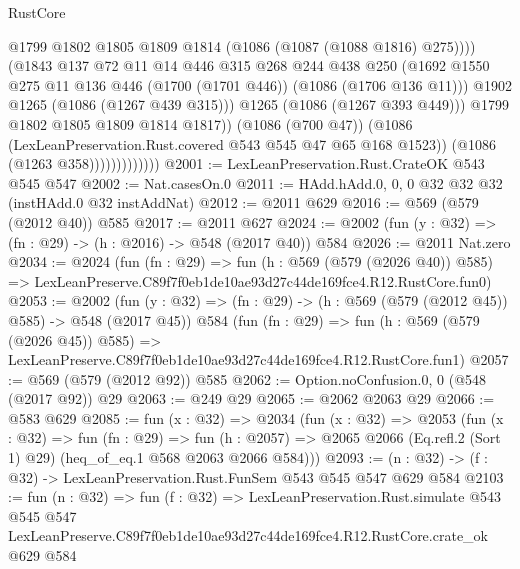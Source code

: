 \begin{lexlean}{RustCore}
\begin{coremodule}
                                    @1799
                                    @1802
                                    @1805
                                    @1809
                                    @1814
                                    (@1086 (@1087 (@1088 @1816) @275))))
                                (@1843
                                  @137
                                  @72
                                  @11
                                  @14
                                  @446
                                  @315
                                  @268
                                  @244
                                  @438
                                  @250
                                  (@1692
                                    @1550
                                    @275
                                    @11
                                    @136
                                    @446
                                    (@1700 (@1701 @446))
                                    (@1086 (@1706 @136 @11)))
                                  @1902
                                  @1265
                                  (@1086 (@1267 @439 @315)))
                                @1265
                                (@1086 (@1267 @393 @449)))
                              @1799
                              @1802
                              @1805
                              @1809
                              @1814
                              @1817))
                          (@1086 (@700 @47))
                          (@1086 (LexLeanPreservation.Rust.covered @543 @545 @47 @65 @168 @1523))
                          (@1086 (@1263 @358)))))))))))))
@2001 := LexLeanPreservation.Rust.CrateOK @543 @545 @547
@2002 := Nat.casesOn.{0}
@2011 := HAdd.hAdd.{0, 0, 0} @32 @32 @32 (instHAdd.{0} @32 instAddNat)
@2012 := @2011 @629
@2016 := @569 (@579 (@2012 @40)) @585
@2017 := @2011 @627
@2024 := @2002 (fun (y : @32) => (fn : @29) -> (h : @2016) -> @548 (@2017 @40)) @584
@2026 := @2011 Nat.zero
@2034 := @2024
    (fun (fn : @29) =>
    fun (h : @569 (@579 (@2026 @40)) @585) =>
    LexLeanPreserve.C89f7f0eb1de10ae93d27c44de169fce4.R12.RustCore.fun0)
@2053 := @2002
    (fun (y : @32) => (fn : @29) -> (h : @569 (@579 (@2012 @45)) @585) -> @548 (@2017 @45))
    @584
    (fun (fn : @29) =>
    fun (h : @569 (@579 (@2026 @45)) @585) =>
    LexLeanPreserve.C89f7f0eb1de10ae93d27c44de169fce4.R12.RustCore.fun1)
@2057 := @569 (@579 (@2012 @92)) @585
@2062 := Option.noConfusion.{0, 0} (@548 (@2017 @92)) @29
@2063 := @249 @29
@2065 := @2062 @2063 @29
@2066 := @583 @629
@2085 := fun (x : @32) =>
  @2034
    (fun (x : @32) =>
    @2053
      (fun (x : @32) =>
      fun (fn : @29) =>
      fun (h : @2057) =>
      @2065 @2066 (Eq.refl.{2} (Sort 1) @29) (heq_of_eq.{1} @568 @2063 @2066 @584)))
@2093 := (n : @32) -> (f : @32) -> LexLeanPreservation.Rust.FunSem @543 @545 @547 @629 @584
@2103 := fun (n : @32) =>
  fun (f : @32) =>
  LexLeanPreservation.Rust.simulate
    @543
    @545
    @547
    LexLeanPreserve.C89f7f0eb1de10ae93d27c44de169fce4.R12.RustCore.crate_ok
    @629
    @584
\end{coremodule}
\end{lexlean}
